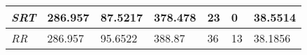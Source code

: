 \documentclass{article}
\begin{document}
\begin{table}[h!]
\begin{tabular}{|l|l|l|l|l|l|l|}
  \textit{SRT}       & 286.957                                                                          & 87.5217                                                                     & 378.478                                                                            & 23                                                                                    & 0                                                                                   & 38.5514                                                                    \\ \hline
  \textit{RR}        & 286.957                                                                          & 95.6522                                                                     & 388.87                                                                             & 36                                                                                    & 13                                                                                  & 38.1856                                                                    \\ \hline
  \end{tabular}
\end{table}
\end{document}
